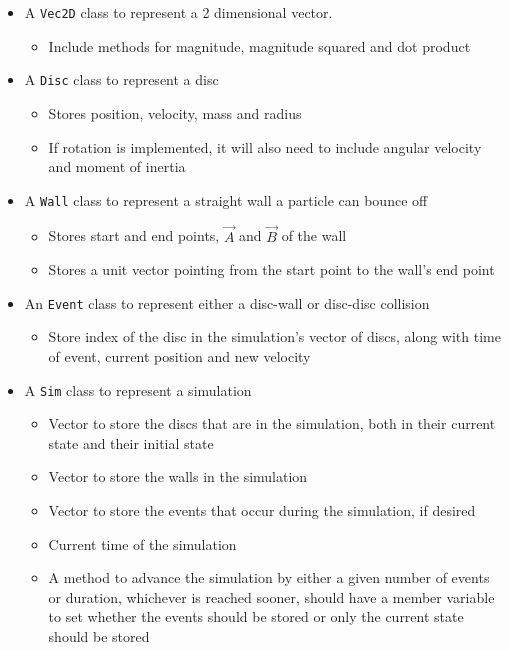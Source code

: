 \documentclass{article}
\begin{document}
\begin{itemize}
    \item A \texttt{Vec2D} class to represent a 2 dimensional vector.
    \begin{itemize}
        \item Include methods for magnitude, magnitude squared and dot product
    \end{itemize}
    \item A \texttt{Disc} class to represent a disc
    \begin{itemize}
        \item Stores position, velocity, mass and radius
        \item If rotation is implemented, it will also need to include angular velocity and moment of inertia
    \end{itemize}
    \item A \texttt{Wall} class to represent a straight wall a particle can bounce off
    \begin{itemize}
        \item Stores start and end points, $\vec{A}$ and $\vec{B}$ of the wall
        \item Stores a unit vector pointing from the start point to the wall's end point 
    \end{itemize}
    \item An \texttt{Event} class to represent either a disc-wall or disc-disc collision
    \begin{itemize}
        \item Store index of the disc in the simulation's vector of discs, along with time of event, current position and new velocity
    \end{itemize}
    \item A \texttt{Sim} class to represent a simulation
    \begin{itemize}
        \item Vector to store the discs that are in the simulation, both in their current state and their initial state
        \item Vector to store the walls in the simulation
        \item Vector to store the events that occur during the simulation, if desired
        \item Current time of the simulation
        \item A method to advance the simulation by either a given number of events or duration, whichever is reached sooner, should have a member variable to set whether the events should be stored or only the current state should be stored
    \end{itemize}
\end{itemize}
\end{document}
